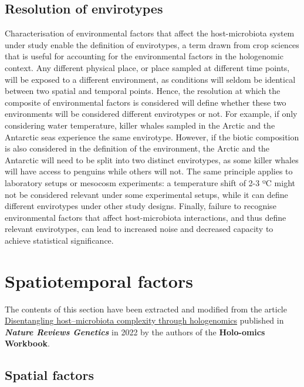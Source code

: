 \documentclass[
]{book}
\begin{document}
\hypertarget{envirotype-resolution}{%
\subsection*{Resolution of envirotypes}\label{envirotype-resolution}}

Characterisation of environmental factors that affect the host-microbiota system under study enable the definition of envirotypes, a term drawn from crop sciences that is useful for accounting for the environmental factors in the hologenomic context. Any different physical place, or place sampled at different time points, will be exposed to a different environment, as conditions will seldom be identical between two spatial and temporal points. Hence, the resolution at which the composite of environmental factors is considered will define whether these two environments will be considered different envirotypes or not. For example, if only considering water temperature, killer whales sampled in the Arctic and the Antarctic seas experience the same envirotype. However, if the biotic composition is also considered in the definition of the environment, the Arctic and the Antarctic will need to be split into two distinct envirotypes, as some killer whales will have access to penguins while others will not. The same principle applies to laboratory setups or mesocosm experiments: a temperature shift of 2-3 ºC might not be considered relevant under some experimental setups, while it can define different envirotypes under other study designs. Finally, failure to recognise environmental factors that affect host-microbiota interactions, and thus define relevant envirotypes, can lead to increased noise and decreased capacity to achieve statistical significance.

\hypertarget{spatiotemporal-factors}{%
\section{Spatiotemporal factors}\label{spatiotemporal-factors}}

The contents of this section have been extracted and modified from the article \href{https://www.nature.com/articles/s41576-021-00421-0}{Disentangling host--microbiota complexity through hologenomics} published in \textbf{\emph{Nature Reviews Genetics}} in 2022 by the authors of the \textbf{Holo-omics Workbook}.

\hypertarget{spatial-factors}{%
\subsection*{Spatial factors}\label{spatial-factors}}
\end{document}

